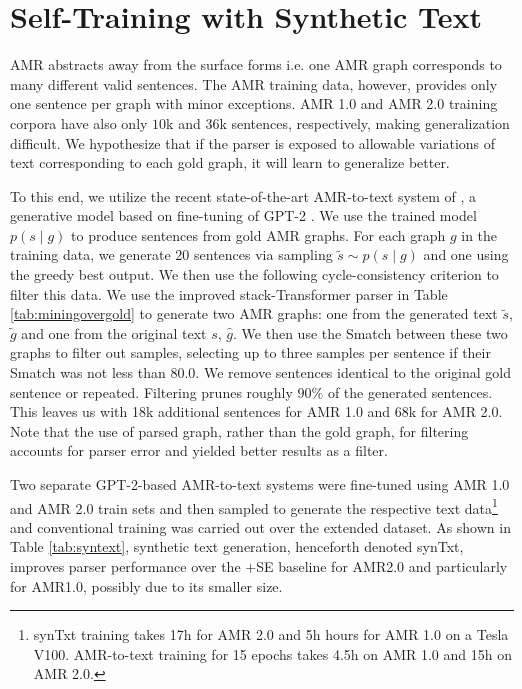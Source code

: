 \documentclass[11pt,a4paper]{article}
\begin{document}
\section{Self-Training with Synthetic Text}
\label{section:synthetictext}
AMR abstracts away from the surface forms i.e. one AMR graph corresponds to many different valid sentences. The AMR training data, however, provides only one sentence per graph with minor exceptions. AMR 1.0 and AMR 2.0 training corpora have also only $10$k and $36$k sentences, respectively, making generalization difficult. We hypothesize that if the parser is exposed to allowable variations of text corresponding to each gold graph, it will learn to generalize better.

To this end, we utilize the recent state-of-the-art AMR-to-text system of , a generative model based on fine-tuning of GPT-2 \cite{radford2019language}. We use the trained model $p(s \mid g)$ to produce sentences from gold AMR graphs. For each graph $g$ in the training data, we generate $20$ sentences via sampling $\tilde{s} \sim p(s \mid g)$ and one using the greedy best output. We then use the following cycle-consistency criterion to filter this data. We use the improved stack-Transformer parser in Table \ref{tab:miningovergold} to generate two AMR graphs: one from the generated text $\tilde{s}$, $\tilde{g}$ and one from the original text $s$, $\hat{g}$. We then use the Smatch between these two graphs to filter out samples, selecting up to three samples per sentence if their Smatch was not less than $80.0$. We remove sentences identical to the original gold sentence or repeated. Filtering prunes roughly $90\%$ of the generated sentences. This leaves us with 18k additional sentences for AMR 1.0 and 68k for AMR 2.0. Note that the use of parsed graph, rather than the gold graph, for filtering accounts for parser error and yielded better results as a filter.

Two separate GPT-2-based AMR-to-text systems were fine-tuned using AMR 1.0 and AMR 2.0 train sets and then sampled to generate the respective text data\footnote{synTxt training takes 17h for AMR 2.0 and 5h hours for AMR 1.0 on a Tesla V100. AMR-to-text training for 15 epochs takes 4.5h on AMR 1.0 and 15h on AMR 2.0.} and conventional training was carried out over the extended dataset. As shown in Table \ref{tab:syntext}, synthetic text generation, henceforth denoted synTxt, improves parser performance over the \cite{anon2020a}$+$SE baseline for AMR2.0 and particularly for AMR1.0, possibly due to its smaller size.  
\end{document}
